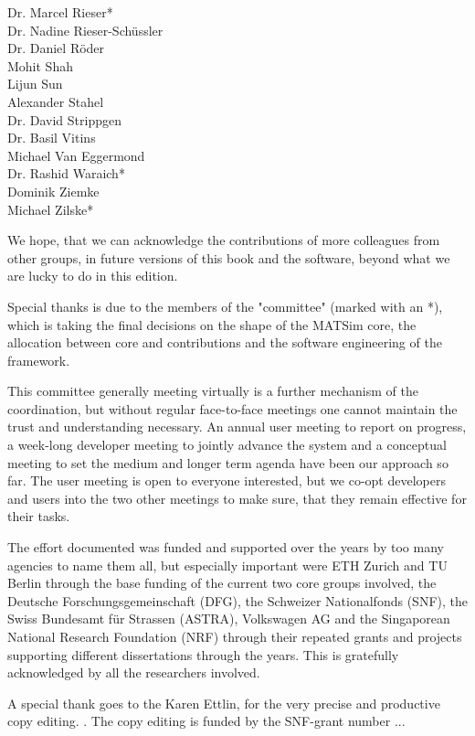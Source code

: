 \begin{multicols}{3}
Dr. Marcel Rieser\mbox{*} \\
Dr. Nadine Rieser-Schüssler \\
Dr. Daniel Röder \\
Mohit Shah \\
Lijun Sun \\
Alexander Stahel \\
Dr. David Strippgen \\
Dr. Basil Vitins \\
Michael Van Eggermond \\
Dr. Rashid Waraich\mbox{*} \\
Dominik Ziemke \\
Michael Zilske\mbox{*} \\
\end{multicols}
% 
We hope, that we can acknowledge the contributions of more colleagues from other groups, in future versions of this book and the software, beyond what we are lucky to do in this edition.   

Special thanks is due to the members of the "committee" (marked with an \mbox{*}), which is taking the final decisions on the shape of the MATSim core, the allocation between core and contributions and the software engineering of the framework.

This committee generally meeting virtually is a further mechanism of the coordination, but without regular face-to-face meetings one cannot maintain the trust and understanding necessary. An annual user meeting to report on progress, a week-long developer meeting to jointly advance the system and a conceptual meeting to set the medium and longer term agenda have been our approach so far. The user meeting is open to everyone interested, but we co-opt developers and users into the two other meetings to make sure, that they remain effective for their tasks. 

The effort documented was funded and supported over the years by too many agencies to name them all, but especially important were ETH Zurich and TU Berlin through the base funding of the current two core groups involved, the Deutsche Forschungsgemeinschaft (DFG), the Schweizer Nationalfonds (SNF), the Swiss Bundesamt für Strassen (ASTRA), Volkswagen AG and the Singaporean National Research Foundation (NRF) through their repeated grants and projects supporting different dissertations through the years. This is gratefully acknowledged by all the researchers involved. 

A special thank goes to the Karen Ettlin, for the very precise and productive copy editing. . The copy editing is funded by the SNF-grant number ... 

